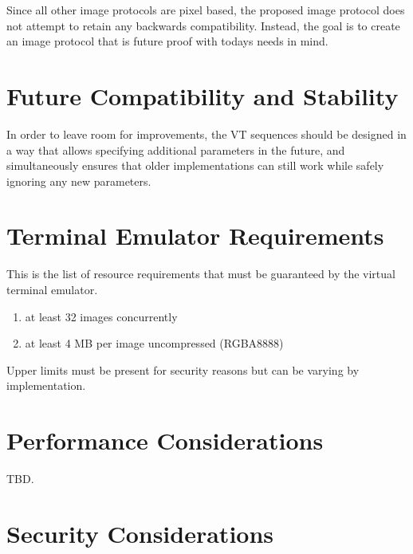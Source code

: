 \documentclass[a4paper]{article}
\begin{document}
Since all other image protocols are pixel based, the proposed image protocol does not
attempt to retain any backwards compatibility. Instead, the goal is to create
an image protocol that is future proof with todays needs in mind.

\section{Future Compatibility and Stability} %

In order to leave room for improvements, the VT sequences should be designed in a way
that allows specifying additional parameters in the future, and simultaneously ensures
that older implementations can still work while safely ignoring any new parameters.

\section{Terminal Emulator Requirements} %

This is the list of resource requirements that must be guaranteed
by the virtual terminal emulator.

\begin{enumerate}
    \item at least 32 images concurrently
    \item at least 4 MB per image uncompressed (RGBA8888)
\end{enumerate}

Upper limits must be present for security reasons but can be varying by implementation.

\section{Performance Considerations} %

TBD.

\section{Security Considerations} %
\end{document}
